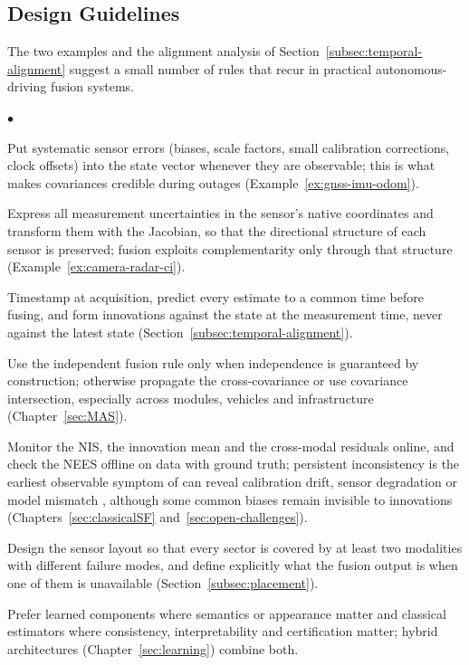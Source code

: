 \documentclass[graybox,envcountchap]{style/SNmono}
\newenvironment{list4a}{
  \begin{list}{$\bullet$}{
      \setlength{\itemsep}{0.05cm}
      \setlength{\labelsep}{0.2cm}
      \setlength{\labelwidth}{0.3cm}
      \setlength{\parsep}{0in}
      \setlength{\parskip}{0in}
      \setlength{\topsep}{0in}
      \setlength{\partopsep}{0in}
      \setlength{\leftmargin}{0.16in}}}
      {\end{list}}
\providecommand{\DIFadd}[1]{{\protect\color{blue} #1}} %
\providecommand{\DIFdel}[1]{{\protect\color{red} #1}} %
\providecommand{\DIFaddbegin}{} %
\providecommand{\DIFaddend}{} %
\providecommand{\DIFdelbegin}{} %
\providecommand{\DIFdelend}{} %
\begin{document}
\subsection{Design Guidelines}
\label{subsec:design-guidelines}

The two examples and the alignment analysis of Section~\ref{subsec:temporal-alignment} suggest a small number of rules that recur in practical autonomous-driving fusion systems.
\begin{list4a}
\item Put systematic sensor errors (biases, scale factors, small calibration corrections, clock offsets) into the state vector whenever they are observable; this is what makes covariances credible during outages (Example~\ref{ex:gnss-imu-odom}).
\item Express all measurement uncertainties in the sensor's native coordinates and transform them with the Jacobian, so that the directional structure of each sensor is preserved; fusion exploits complementarity only through that structure (Example~\ref{ex:camera-radar-ci}).
\item Timestamp at acquisition, predict every estimate to a common time before fusing, and form innovations against the state at the measurement time, never against the latest state (Section~\ref{subsec:temporal-alignment}).
\item Use the independent fusion rule only when independence is guaranteed by construction; otherwise propagate the cross-covariance or use covariance intersection, especially across modules, vehicles and infrastructure (Chapter~\ref{sec:MAS}).
\item Monitor the NIS, the innovation mean and the cross-modal residuals online, and check the NEES offline on data with ground truth; persistent inconsistency \DIFdelbegin \DIFdel{is the earliest observable symptom of }\DIFdelend \DIFaddbegin \DIFadd{can reveal }\DIFaddend calibration drift, sensor degradation or model mismatch\DIFaddbegin \DIFadd{, although some common biases remain invisible to innovations }\DIFaddend (Chapters~\ref{sec:classicalSF} and~\ref{sec:open-challenges}).
\item Design the sensor layout so that every sector is covered by at least two modalities with different failure modes, and define explicitly what the fusion output is when one of them is unavailable (Section~\ref{subsec:placement}).
\item Prefer learned components where semantics or appearance matter and classical estimators where consistency, interpretability and certification matter; hybrid architectures (Chapter~\ref{sec:learning}) combine both.
\end{list4a}
\end{document}
